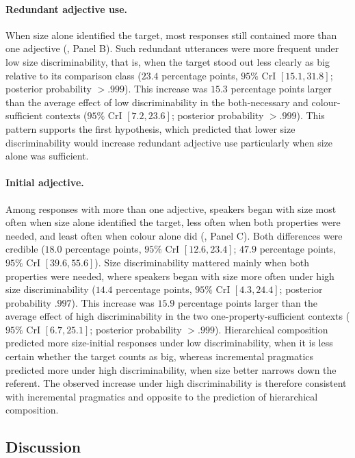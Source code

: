 \documentclass[10pt,a4paper,fleqn]{article}
\begin{document}
\paragraph{Redundant adjective use.}
When size alone identified the target, most responses still contained more than one adjective (, Panel B).
Such redundant utterances were more frequent under low size discriminability, that is, when the target stood out less clearly as big relative to its comparison class ($23.4$ percentage points, $95\%$ CrI $[15.1,31.8]$; posterior probability $>.999$).
This increase was $15.3$ percentage points larger than the average effect of low discriminability in the both-necessary and colour-sufficient contexts ($95\%$ CrI $[7.2,23.6]$; posterior probability $>.999$).
This pattern supports the first hypothesis, which predicted that lower size discriminability would increase redundant adjective use particularly when size alone was sufficient.

\paragraph{Initial adjective.}
Among responses with more than one adjective, speakers began with size most often when size alone identified the target, less often when both properties were needed, and least often when colour alone did (, Panel C).
Both differences were credible ($18.0$ percentage points, $95\%$ CrI $[12.6,23.4]$; $47.9$ percentage points, $95\%$ CrI $[39.6,55.6]$).
Size discriminability mattered mainly when both properties were needed, where speakers began with size more often under high size discriminability ($14.4$ percentage points, $95\%$ CrI $[4.3,24.4]$; posterior probability $.997$).
This increase was $15.9$ percentage points larger than the average effect of high discriminability in the two one-property-sufficient contexts ($95\%$ CrI $[6.7,25.1]$; posterior probability $>.999$).
Hierarchical composition predicted more size-initial responses under low discriminability, when it is less certain whether the target counts as big, whereas incremental pragmatics predicted more under high discriminability, when size better narrows down the referent.
The observed increase under high discriminability is therefore consistent with incremental pragmatics and opposite to the prediction of hierarchical composition.

\subsection{Discussion}
\label{sec:production-discussion}
\end{document}
